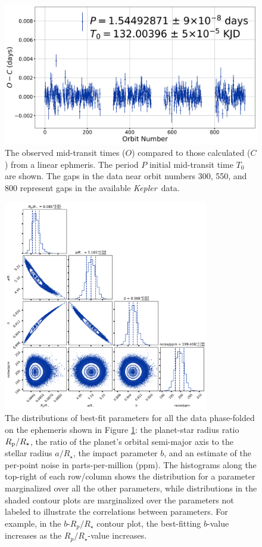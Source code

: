 \documentclass[manuscript]{aastex62}
\newcommand{\kepler}{{\it Kepler}}
\begin{document}
\begin{figure}
    \includegraphics[width=\textwidth]{TTVs_Analysis_of_Kepler76b.png}
    \caption{The observed mid-transit times ($O$) compared to those calculated ($C$) from a linear ephmeris. The period $P$ initial mid-transit time $T_0$ are shown. The gaps in the data near orbit numbers 300, 550, and 800 represent gaps in the available \kepler\ data.}
    \label{fig:TTVs_Analysis_of_Kepler76b}
\end{figure}

\begin{figure}
    \includegraphics[width=0.8\textwidth]{folded-transit-corner-plot_Analysis-of-Kepler76b.png}
    \caption{The distributions of best-fit parameters for all the data phase-folded on the ephemeris shown in Figure \ref{fig:TTVs_Analysis_of_Kepler76b}: the planet-star radius ratio $R_{\rm p}/R_\star$, the ratio of the planet's orbital semi-major axis to the stellar radius $a/R_\star$, the impact parameter $b$, and an estimate of the per-point noise in parts-per-million (ppm). The histograms along the top-right of each row/column shows the distribution for a parameter marginalized over all the other parameters, while distributions in the shaded contour plots are marginalized over the parameters not labeled to illustrate the correlations between parameters. For example, in the $b$-$R_p/R_\star$ contour plot, the best-fitting $b$-value increases as the $R_p/R_\star$-value increases.}
    \label{fig:folded-transit-corner-plot_Analysis-of-Kepler76b}
\end{figure}
\end{document}
